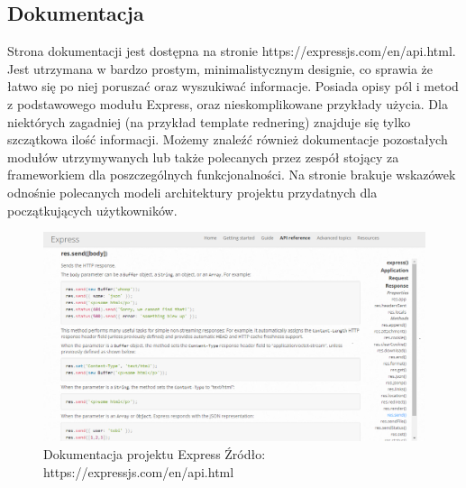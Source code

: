 \documentclass[12pt]{report}
\begin{document}
    \subsection{Dokumentacja}
      Strona dokumentacji jest dostępna na stronie https://expressjs.com/en/api.html.
      Jest utrzymana w bardzo prostym, minimalistycznym designie, co sprawia że łatwo się po niej poruszać oraz wyszukiwać informacje.
      Posiada opisy pól i metod z podstawowego modułu Express, oraz nieskomplikowane przykłady użycia.
      Dla niektórych zagadniej (na przykład template rednering) znajduje się tylko szczątkowa ilość informacji.
      Możemy znaleźć również dokumentacje pozostałych modułów utrzymywanych lub także polecanych przez zespół stojący za frameworkiem dla poszczególnych funkcjonalności.
      Na stronie brakuje wskazówek odnośnie polecanych modeli architektury projektu przydatnych dla początkujących użytkowników.
      \newline
      \newline
      \newline
      \newline
      \newline
      \newline
      \newline
      \newline
      \newline
      \newline
      \newline
      \newline
      \newline
      \newline
      \newline
      \newline
      \begin{figure}[H]
        \centering
        \includegraphics[width=\textwidth,height=\textheight,keepaspectratio]{doc_express.png} 
        \caption{Dokumentacja projektu Express \newline Źródło: https://expressjs.com/en/api.html}
      \end{figure}
\end{document}
